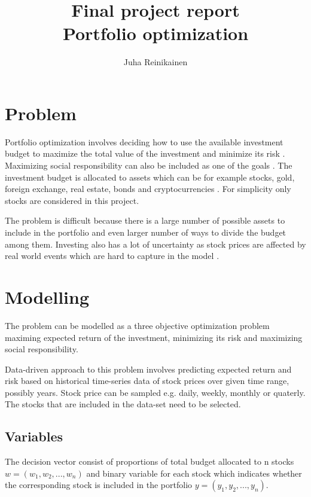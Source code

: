\documentclass[11pt]{article} %
\title{Final project report\\
	   Portfolio optimization}
\author{Juha Reinikainen}
\begin{document}
\maketitle

\section{Problem}

Portfolio optimization involves deciding how to use the available investment budget to maximize the total value of the investment and minimize its risk \cite{van2021parden}. Maximizing social responsibility can also be included as one of the goals \cite{chen2021social}. The investment budget is allocated to assets which can be for example stocks, gold, foreign exchange, real estate, bonds and cryptocurrencies \cite{faizan2019multiobjective}. For simplicity only stocks are considered in this project.

The problem is difficult because there is a large number of possible assets to include in the portfolio and even larger number of ways to divide the budget among them. Investing also has a lot of uncertainty as stock prices are affected by real world events which are hard to capture in the model \cite{du2020new}.


\section{Modelling}

The problem can be modelled as a three objective optimization problem maximing expected return of the investment, minimizing its risk and maximizing social responsibility.

Data-driven approach to this problem involves predicting expected return and risk based on historical time-series data of stock prices over given time range, possibly years. Stock price can be sampled e.g. daily, weekly, monthly or quaterly. The stocks that are included in the data-set need to be selected.


\subsection{Variables}

The decision vector consist of proportions of total budget allocated to n stocks $w = (w_1, w_2, ..., w_n)$ and binary variable for each stock which indicates whether the corresponding stock is included in the portfolio $y=(y_1, y_2,..., y_n)$. 
\end{document}
